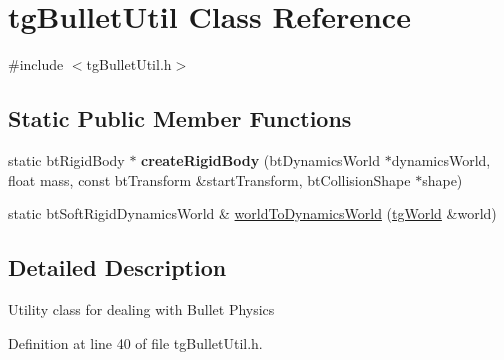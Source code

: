 \hypertarget{classtg_bullet_util}{\section{tg\-Bullet\-Util Class Reference}
\label{classtg_bullet_util}
}


{\ttfamily \#include $<$tg\-Bullet\-Util.\-h$>$}

\subsection*{Static Public Member Functions}
\begin{DoxyCompactItemize}
\item 
\hypertarget{classtg_bullet_util_a9a557c0fbf39ab0b29a2d5b97edc2be9}{static bt\-Rigid\-Body $\ast$ {\bfseries create\-Rigid\-Body} (bt\-Dynamics\-World $\ast$dynamics\-World, float mass, const bt\-Transform \&start\-Transform, bt\-Collision\-Shape $\ast$shape)}\label{classtg_bullet_util_a9a557c0fbf39ab0b29a2d5b97edc2be9}

\item 
static bt\-Soft\-Rigid\-Dynamics\-World \& \hyperlink{classtg_bullet_util_a91ab094c3c3cc9ab7402a3618cc75946}{world\-To\-Dynamics\-World} (\hyperlink{classtg_world}{tg\-World} \&world)
\end{DoxyCompactItemize}


\subsection{Detailed Description}
Utility class for dealing with Bullet Physics 

Definition at line 40 of file tg\-Bullet\-Util.\-h.



